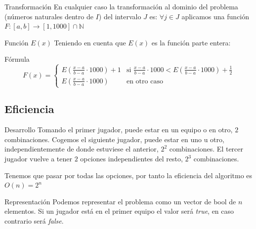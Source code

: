 \begin{frame}
	\begin{block}{Transformación}
	En cualquier caso la transformación al dominio del problema (números naturales dentro de $I$) 
	del intervalo $J$ es: $\forall j\in J$ aplicamos una función $F:[a,b] \rightarrow
	[1,1000]\cap\mathbb{N}$
	\end{block}
	
	\begin{exampleblock}	{Función $E(x)$}
	Teniendo en cuenta que $E(x)$ es la función parte entera:
	\end{exampleblock}
	
	\begin{exampleblock}{Fórmula}
	\[F(x) = \left\{
	\begin{matrix}
		E\left( \frac{x-a}{b-a}\cdot 1000 \right)+1  & 
		\mbox{si } \frac{x-a}{b-a}\cdot 1000 < 
					E\left( \frac{x-a}{b-a}\cdot 1000 \right) + \frac{1}{2}

	 \\	E\left( \frac{x-a}{b-a}\cdot 1000 \right)    & 
	 	\mbox{en otro caso}
	\end{matrix}
	\right.\]
	\end{exampleblock}
\end{frame}

\subsection{Eficiencia}
\begin{frame}
	\begin{block}{Desarrollo}
	Tomando el primer jugador, puede estar en un equipo o en otro, $2$ combinaciones. 
	Cogemos el siguiente jugador, puede estar en uno u otro, independientemente de donde 
	estuviese el anterior, $2^2$ combinaciones. 
	El tercer jugador vuelve a tener $2$ opciones independientes del resto, $2^3$ combinaciones. 	
	
	Tenemos que pasar por todas las opciones, por tanto la eficiencia del algoritmo es $O(n)=2^n$
	\end{block}
	
	\begin{block}{Representación}
	Podemos representar el problema como un vector de bool de $n$ elementos. Si un jugador está
	en el primer equipo el valor será \textit{true}, en caso contrario será \textit{false}.
	\end{block}
\end{frame}

